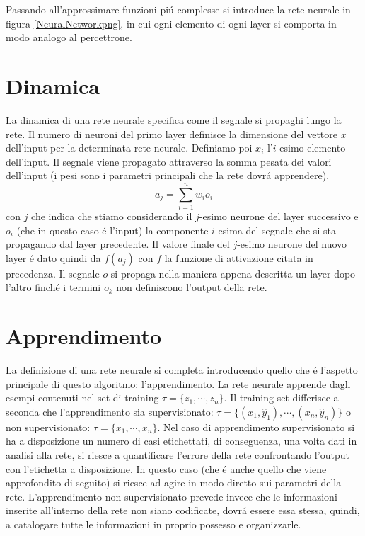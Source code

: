 \documentclass[a4paper,12pt]{report}
\begin{document}
 Passando all'approssimare funzioni pi\'u complesse si introduce la rete neurale in figura \ref{NeuralNetworkpng}, in cui ogni elemento di ogni layer si comporta in modo analogo al percettrone.

 
 \section{Dinamica}
 
 La dinamica di una rete neurale specifica come il segnale si propaghi lungo la rete. 
 Il numero di neuroni del primo layer definisce la dimensione del vettore $x$ dell'input per la determinata rete neurale. 
 Definiamo poi $x_i$ l'$i$-esimo elemento dell'input. 
 Il segnale viene propagato attraverso la somma pesata dei valori dell'input (i pesi sono i parametri principali che la rete dovr\'a apprendere).
 \begin{equation}
  a_j = \sum_{i=1}^n w_i o_i
 \end{equation}
 con $j$ che indica che stiamo considerando il $j$-esimo neurone del layer successivo e $o_i$ (che in questo caso \'e l'input) la componente $i$-esima del segnale che si sta propagando dal layer precedente. 
 Il valore finale del $j$-esimo neurone del nuovo layer \'e dato quindi da $f(a_j)$ con $f$ la funzione di attivazione citata in precedenza. 
 Il segnale $o$ si propaga nella maniera appena descritta un layer dopo l'altro finch\'e i termini $o_k$ non definiscono l'output della rete.
 
 \section{Apprendimento}
 
 La definizione di una rete neurale si completa introducendo quello che \'e l'aspetto principale di questo algoritmo: l'apprendimento. 
 La rete neurale apprende dagli esempi contenuti nel set di training $\tau = \{ z_1, \cdots ,z_n \} $. Il training set differisce a seconda che l'apprendimento sia supervisionato: $\tau = \{ (x_1,\widehat{y}_1), \cdots , (x_n,\widehat{y}_n)\}$ o non supervisionato: $\tau = \{x_1,\cdots,x_n\}$.
 Nel caso di apprendimento supervisionato si ha a disposizione un numero di casi etichettati, di conseguenza, una volta dati in analisi alla rete, si riesce a quantificare l'errore della rete confrontando l'output con l'etichetta a disposizione. 
 In questo caso (che \'e anche quello che viene approfondito di seguito) si riesce ad agire in modo diretto sui parametri della rete. 
 L'apprendimento non supervisionato prevede invece che le informazioni inserite all'interno della rete non siano codificate, dovr\'a essere essa stessa, quindi, a catalogare tutte le informazioni in proprio possesso e organizzarle.
 
\end{document}
